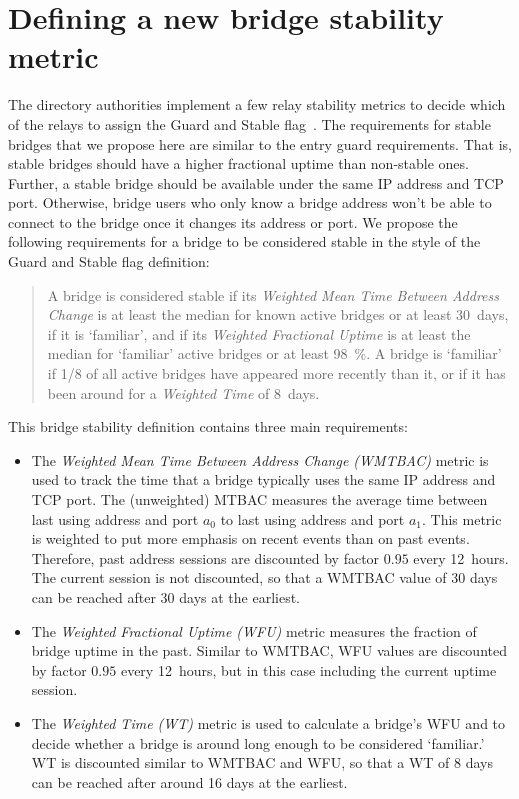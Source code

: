 \documentclass{article}
\begin{document}
\section{Defining a new bridge stability metric}
\label{sec:defining}

The directory authorities implement a few relay stability metrics to
decide which of the relays to assign the Guard and Stable
flag~\cite{dirspec, loesing2011analysis}.
The requirements for stable bridges that we propose here are similar to
the entry guard requirements.
That is, stable bridges should have a higher fractional uptime than
non-stable ones.
Further, a stable bridge should be available under the same IP address and
TCP port.
Otherwise, bridge users who only know a bridge address won't be able to
connect to the bridge once it changes its address or port.
We propose the following requirements for a bridge to be considered
stable in the style of the Guard and Stable flag definition:

\label{def:bridgestability}
\begin{quote}
A bridge is considered stable if its \emph{Weighted Mean Time Between
Address Change} is at least the median for known active bridges or at
least 30~days, if it is `familiar', and if its \emph{Weighted Fractional
Uptime} is at least the median for `familiar' active bridges or at least
98~\%.
A bridge is `familiar' if 1/8 of all active bridges have appeared more
recently than it, or if it has been around for a \emph{Weighted Time} of
8~days.
\end{quote}

This bridge stability definition contains three main requirements:

\begin{itemize}
\item The \emph{Weighted Mean Time Between Address Change (WMTBAC)}
metric is used to track the time that a bridge typically uses the same IP
address and TCP port.
The (unweighted) MTBAC measures the average time between last using
address and port $a_0$ to last using address and port $a_1$.
This metric is weighted to put more emphasis on recent events than on past
events.
Therefore, past address sessions are discounted by factor $0.95$ every
12~hours.
The current session is not discounted, so that a WMTBAC value of 30 days
can be reached after 30 days at the earliest.
\item The \emph{Weighted Fractional Uptime (WFU)} metric measures the
fraction of bridge uptime in the past.
Similar to WMTBAC, WFU values are discounted by factor $0.95$ every
12~hours, but in this case including the current uptime session.
\item The \emph{Weighted Time (WT)} metric is used to calculate a bridge's
WFU and to decide whether a bridge is around long enough to be considered
`familiar.'
WT is discounted similar to WMTBAC and WFU, so that a WT of 8 days can be
reached after around 16 days at the earliest.
\end{itemize}
\end{document}
